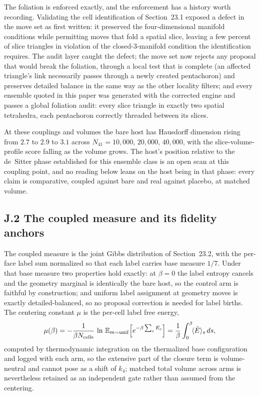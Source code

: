 \documentclass[11pt]{article}
\begin{document}
The foliation is enforced exactly, and the enforcement has a history worth recording. Validating the cell identification of Section~23.1 exposed a defect in the move set as first written: it preserved the four-dimensional manifold conditions while permitting moves that fold a spatial slice, leaving a few percent of slice triangles in violation of the closed-$3$-manifold condition the identification requires. The audit layer caught the defect; the move set now rejects any proposal that would break the foliation, through a local test that is complete (an affected triangle's link necessarily passes through a newly created pentachoron) and preserves detailed balance in the same way as the other locality filters; and every ensemble quoted in this paper was generated with the corrected engine and passes a global foliation audit: every slice triangle in exactly two spatial tetrahedra, each pentachoron correctly threaded between its slices.

At these couplings and volumes the bare host has Hausdorff dimension rising from $2.7$ to $2.9$ to $3.1$ across $N_{41}=10{,}000$, $20{,}000$, $40{,}000$, with the slice-volume-profile score falling as the volume grows. The host's position relative to the de~Sitter phase established for this ensemble class \citep{AmbjornJurkiewiczLoll2004} is an open scan at this coupling point, and no reading below leans on the host being in that phase: every claim is comparative, coupled against bare and real against placebo, at matched volume.

\subsection*{J.2 The coupled measure and its fidelity anchors}

The coupled measure is the joint Gibbs distribution of Section~23.2, with the per-face label sum normalized so that each label carries base measure $1/7$. Under that base measure two properties hold exactly: at $\beta=0$ the label entropy cancels and the geometry marginal is identically the bare host, so the control arm is faithful by construction; and uniform label assignment at geometry moves is exactly detailed-balanced, so no proposal correction is needed for label births. The centering constant $\mu$ is the per-cell label free energy,
\[
\mu(\beta)=-\frac{1}{\beta N_{\rm cells}}\,\ln\,\mathbb{E}_{m\sim{\rm unif}}\!\left[e^{-\beta\sum_c E_c}\right]
=\frac{1}{\beta}\int_0^\beta\!\langle \bar E\rangle_s\,ds,
\]
computed by thermodynamic integration on the thermalized base configuration and logged with each arm, so the extensive part of the closure term is volume-neutral and cannot pose as a shift of $k_4$; matched total volume across arms is nevertheless retained as an independent gate rather than assumed from the centering.
\end{document}
